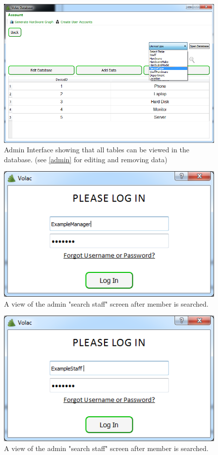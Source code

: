 \begin{figure}[H]
    \includegraphics[width=\textwidth]{./Evaluation/Images/admin1.png}
    \caption{Admin Interface showing that all tables can be viewed in the database. (see \ref{admin} for editing and removing data)}
\end{figure}

\begin{figure}[H]
    \includegraphics[width=\textwidth]{./Evaluation/Images/login3.png}
    \caption{A view of the admin "search staff" screen after member is searched.} 
\end{figure}

\begin{figure}[H]
    \includegraphics[width=\textwidth]{./Evaluation/Images/login4.png}
    \caption{A view of the admin "search staff" screen after member is searched.} 
\end{figure}

